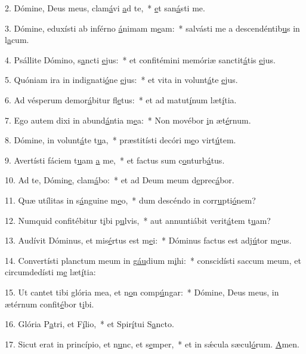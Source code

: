 2. Dómine, Deus meus, clam\uline{á}vi \uline{a}d te,~* \uline{e}t san\uline{á}sti me.\par 
3. Dómine, eduxísti ab inférno \uline{á}nimam m\uline{e}am:~* salvásti me a descendéntib\uline{u}s in l\uline{a}cum.\par 
4. Psállite Dómino, s\uline{a}ncti \uline{e}jus:~* et confitémini memóriæ sanctit\uline{á}tis \uline{e}jus.\par 
5. Quóniam ira in indignati\uline{ó}ne \uline{e}jus:~* et vita in volunt\uline{á}te \uline{e}jus.\par 
6. Ad vésperum demor\uline{á}bitur fl\uline{e}tus:~* et ad matut\uline{í}num læt\uline{í}tia.\par 
7. Ego autem dixi in abund\uline{á}ntia m\uline{e}a:~* Non movébor \uline{i}n æt\uline{é}rnum.\par 
8. Dómine, in volunt\uline{á}te t\uline{u}a,~* præstitísti decóri m\uline{e}o virt\uline{ú}tem.\par 
9. Avertísti fáciem t\uline{u}am \uline{a} me,~* et factus sum c\uline{o}nturb\uline{á}tus.\par 
10. Ad te, Dómin\uline{e}, clam\uline{á}bo:~* et ad Deum meum d\uline{e}prec\uline{á}bor.\par 
11. Quæ utílitas in s\uline{á}nguine m\uline{e}o,~* dum descéndo in corr\uline{u}pti\uline{ó}nem?\par 
12. Numquid confitébitur t\uline{i}bi p\uline{u}lvis,~* aut annuntiábit verit\uline{á}tem t\uline{u}am?\par 
13. Audívit Dóminus, et mis\uline{é}rtus est m\uline{e}i:~* Dóminus factus est adj\uline{ú}tor m\uline{e}us.\par 
14. Convertísti planctum meum in g\uline{áu}dium m\uline{i}hi:~* conscidísti saccum meum, et circumdedísti m\uline{e} læt\uline{í}tia:\par 
15. Ut cantet tibi glória mea, et n\uline{o}n comp\uline{ú}ngar:~* Dómine, Deus meus, in ætérnum confit\uline{é}bor t\uline{i}bi.\par 
16. Glória P\uline{a}tri, et F\uline{í}lio,~* et Spir\uline{í}tui S\uline{a}ncto.\par 
17. Sicut erat in princípio, et n\uline{u}nc, et s\uline{e}mper,~* et in sǽcula sæcul\uline{ó}rum. \uline{A}men.\par 
